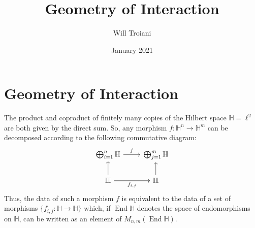 \documentclass[12pt]{article}
\title{Geometry of Interaction}
\author{Will Troiani}
\date{January 2021}
\theoremstyle{plain}
\theoremstyle{definition}
\newcommand{\bb}[1]{\mathbb{#1}}
\newcommand{\lto}{\longrightarrow}
\begin{document}
\maketitle
\tableofcontents


%
%
%
%
%
%
%
%
%
%
%
%
\section{Geometry of Interaction}
The product and coproduct of finitely many copies of the Hilbert space $\bb{H} = \ell^2$ are both given by the direct sum. So, any morphism $f: \bb{H}^n \lto \bb{H}^m$ can be decomposed according to the following commutative diagram:
\begin{equation}
    \begin{tikzcd}
    \bigoplus_{i = 1}^n\bb{H}\arrow[r,"f"] & \bigoplus_{j = 1}^m\bb{H}\\
    \bb{H}\arrow[u]\arrow[r]\arrow[r,swap,"{f_{i,j}}"] & \bb{H}\arrow[u]
    \end{tikzcd}
\end{equation}
Thus, the data of such a morphism $f$ is equivalent to the data of a set of morphisms $\lbrace f_{i,j}: \bb{H} \lto \bb{H}\rbrace$ which, if $\operatorname{End}\bb{H}$ denotes the space of endomorphisms on $\bb{H}$, can be written as an element of $M_{n,m}(\operatorname{End}\bb{H})$.
\end{document}
